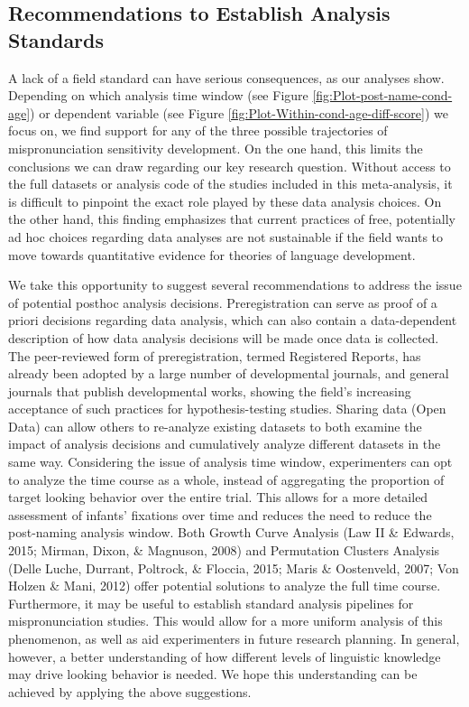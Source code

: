 \documentclass[man]{apa6}
\theoremstyle{definition}
\theoremstyle{definition}
\theoremstyle{definition}
\theoremstyle{remark}
\begin{document}
\subsection{Recommendations to Establish Analysis
Standards}\label{recommendations-to-establish-analysis-standards}

A lack of a field standard can have serious consequences, as our
analyses show. Depending on which analysis time window (see Figure
\ref{fig:Plot-post-name-cond-age}) or dependent variable (see Figure
\ref{fig:Plot-Within-cond-age-diff-score}) we focus on, we find support
for any of the three possible trajectories of mispronunciation
sensitivity development. On the one hand, this limits the conclusions we
can draw regarding our key research question. Without access to the full
datasets or analysis code of the studies included in this meta-analysis,
it is difficult to pinpoint the exact role played by these data analysis
choices. On the other hand, this finding emphasizes that current
practices of free, potentially ad hoc choices regarding data analyses
are not sustainable if the field wants to move towards quantitative
evidence for theories of language development.

We take this opportunity to suggest several recommendations to address
the issue of potential posthoc analysis decisions. Preregistration can
serve as proof of a priori decisions regarding data analysis, which can
also contain a data-dependent description of how data analysis decisions
will be made once data is collected. The peer-reviewed form of
preregistration, termed Registered Reports, has already been adopted by
a large number of developmental journals, and general journals that
publish developmental works, showing the field's increasing acceptance
of such practices for hypothesis-testing studies. Sharing data (Open
Data) can allow others to re-analyze existing datasets to both examine
the impact of analysis decisions and cumulatively analyze different
datasets in the same way. Considering the issue of analysis time window,
experimenters can opt to analyze the time course as a whole, instead of
aggregating the proportion of target looking behavior over the entire
trial. This allows for a more detailed assessment of infants' fixations
over time and reduces the need to reduce the post-naming analysis
window. Both Growth Curve Analysis (Law II \& Edwards, 2015; Mirman,
Dixon, \& Magnuson, 2008) and Permutation Clusters Analysis (Delle
Luche, Durrant, Poltrock, \& Floccia, 2015; Maris \& Oostenveld, 2007;
Von Holzen \& Mani, 2012) offer potential solutions to analyze the full
time course. Furthermore, it may be useful to establish standard
analysis pipelines for mispronunciation studies. This would allow for a
more uniform analysis of this phenomenon, as well as aid experimenters
in future research planning. In general, however, a better understanding
of how different levels of linguistic knowledge may drive looking
behavior is needed. We hope this understanding can be achieved by
applying the above suggestions.
\end{document}
